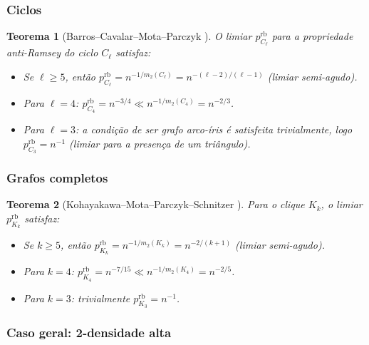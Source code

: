\documentclass[reqno, 12pt]{amsart}
\numberwithin{equation}{section}
\theoremstyle{plain}
\newtheorem{theorem}{Teorema}[section]
\theoremstyle{definition}
\newcommand{\mdens}{m_2}
\begin{document}
\subsubsection*{Ciclos}

\begin{theorem}[Barros--Cavalar--Mota--Parczyk \cite{AntiCycles}]
    \label{thm:anticycles}
    O limiar $p_{C_\ell}^{\mathrm{rb}}$ para a propriedade anti-Ramsey do ciclo $C_\ell$
    satisfaz:
    \begin{itemize}
        \item Se $\ell \ge 5$, então
              $p_{C_\ell}^{\mathrm{rb}} = n^{-1/\mdens(C_\ell)} = n^{-(\ell-2)/(\ell-1)}$
              (limiar semi-agudo).
        \item Para $\ell = 4$:
              $p_{C_4}^{\mathrm{rb}} = n^{-3/4} \ll n^{-1/\mdens(C_4)} = n^{-2/3}$.
        \item Para $\ell = 3$: a condição de ser grafo arco-íris é satisfeita
              trivialmente, logo
              $p_{C_3}^{\mathrm{rb}} = n^{-1}$ (limiar para a presença de um triângulo).
    \end{itemize}
\end{theorem}

\subsubsection*{Grafos completos}

\begin{theorem}[Kohayakawa--Mota--Parczyk--Schnitzer \cite{AntiComplete}]
    \label{thm:anticomplete}
    Para o clique $K_k$, o limiar $p_{K_k}^{\mathrm{rb}}$ satisfaz:
    \begin{itemize}
        \item Se $k \ge 5$, então
              $p_{K_k}^{\mathrm{rb}} = n^{-1/\mdens(K_k)} = n^{-2/(k+1)}$
              (limiar semi-agudo).
        \item Para $k = 4$:
              $p_{K_4}^{\mathrm{rb}} = n^{-7/15} \ll n^{-1/\mdens(K_4)} = n^{-2/5}$.
        \item Para $k = 3$: trivialmente $p_{K_3}^{\mathrm{rb}} = n^{-1}$.
    \end{itemize}
\end{theorem}

\subsubsection*{Caso geral: 2-densidade alta}
\end{document}

